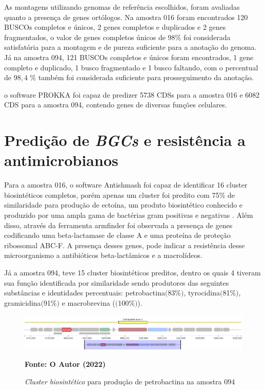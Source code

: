 As montagens utilizando genomas de referência escolhidos, foram avaliadas quanto a presença de genes 
ortólogos. Na amostra 016 foram encontrados 120 BUSCOs completos e únicos, 2 genes completos e duplicados e 2 genes fragmentados,
 o valor de genes completos únicos de 98\% foi considerada satisfatória para a montagem e de pureza suficiente para
a anotação do genoma. Já na amostra 094, 121 BUSCOs completos e únicos foram encontrados, 1 gene completo e duplicado, 1 busco fragmentado
e 1 busco faltando, com o percentual de $98,4$ \% também foi considerada suficiente para prosseguimento da anotação.

o software PROKKA foi capaz de predizer 5738 CDSs para a amostra 016 e 6082 CDS para a amostra 094, contendo genes
de diversas funções celulares. 

\section{Predição de \textit{BGCs} e resistência a antimicrobianos}

Para a amostra 016, o software Antishmash foi capaz de identificar 16 cluster biosintéticos completos, porém
apenas um cluster foi predito com 75\% de similaridade para produção de ectoína, um produto biosintético
conhecido e produzido por uma ampla gama de bactérias gram positivas e negativas \cite{toveken2011specialized}.
Além disso, através da ferramenta armfinder foi observada a presença de genes codificando uma beta-lactamase de classe A e uma proteína de
proteção ribossomal ABC-F. A presença desses genes, pode indicar a resistência desse microorganismo a antibióticos beta-lactâmicos
e a macrolídeos.  

Já a amostra 094, teve 15 cluster biosintéticos preditos, dentro os quais 4 tiveram sua função identificada
por similaridade sendo produtores das seguintes substâncias e identidades percentuais: petrobactina$($83\%$)$, 
tyrocidina$($81\%$)$, gramicidina$($91\%$)$ e macrobrevina ($($100\%$)$). 


 \begin{figure}[H]
	\caption{\textit{Cluster biosintético} para produção de petrobactina na amostra 094}
	\label{fig:quast_16}
	\centering
		\includegraphics[width=0.8\linewidth]{imagens/antismash/094regiao1.png} \\
	\centering
    \begin{small}\textbf{Fonte: O Autor (2022)}\end{small}
\end{figure}
\vspace{\floatsep}

